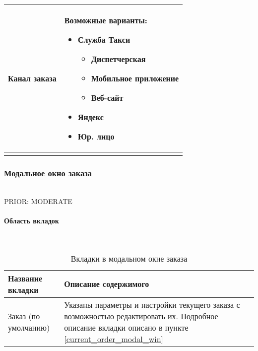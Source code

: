 \begin{longtable}{|p{4cm}|p{9cm}|}
				\hline Канал заказа & Возможные варианты: \begin{itemize} 
															\item Служба Такси
																\begin{itemize}
																	\item Диспетчерская
																	\item Мобильное приложение
																	\item Веб-сайт
																\end{itemize}
															\item Яндекс
															\item Юр. лицо
														  \end{itemize} \\[2mm]
				\hline
				\caption*{} \label{columns_order_journal}	
			\end{longtable}

		\subsubsection{Модальное окно заказа} \label{order_modal_win}

			\\
			PRIOR: MODERATE\\

			\paragraph{Область вкладок} \mbox{} \label{tab_place_order_madal_win}\\

				\begin{table} [h]
	               \begin{center}
	               \caption {Вкладки в модальном окне заказа}
	               \setlength{\extrarowheight}{2mm}
	               \begin{tabular}{|p{5cm}|p{10cm}|}
	                   \hline     \textbf{Название вкладки}&\textbf{Описание содержимого} \\ [2mm]

	                   \hline Заказ (по умолчанию) & Указаны параметры и настройки текущего заказа с возможностью редактировать их. Подробное описание вкладки описано в пункте \ref{current_order_modal_win}\\ [2mm]
	                   \hline
	               \end{tabular}
	               \end{center}
               \end{table}

